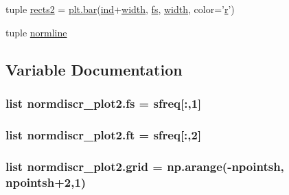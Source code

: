 \begin{DoxyCompactItemize}
\item 
tuple \hyperlink{namespacenormdiscr__plot2_ae0d990d06209b61e3d8b594d36937c72}{rects2} = \hyperlink{eepromer_8c_a2924c0b64ca8f0b241891bcc826b5602}{plt.\+bar}(\hyperlink{namespacenormdiscr__plot2_ad3d531a849a128e7a798433179420165}{ind}+\hyperlink{namespacenormdiscr__plot2_a25df6e806f2a5936e42f0dbb45a6d0ab}{width}, \hyperlink{namespacenormdiscr__plot2_a582805d46fcf8730646fa6cf7ea00b7d}{fs}, \hyperlink{namespacenormdiscr__plot2_a25df6e806f2a5936e42f0dbb45a6d0ab}{width}, color='\hyperlink{indexexpr_8h_ac434fd11cc2493608d8d91424d60c17e}{r}')
\item 
tuple \hyperlink{namespacenormdiscr__plot2_a55c7317cc02371eb982a60573ed2a46f}{normline}
\end{DoxyCompactItemize}


\subsection{Variable Documentation}
\hypertarget{namespacenormdiscr__plot2_a582805d46fcf8730646fa6cf7ea00b7d}{}
\subsubsection[{fs}]{\setlength{\rightskip}{0pt plus 5cm}list normdiscr\+\_\+plot2.\+fs = {\bf sfreq}\mbox{[}\+:,1\mbox{]}}\label{namespacenormdiscr__plot2_a582805d46fcf8730646fa6cf7ea00b7d}
\hypertarget{namespacenormdiscr__plot2_aa348b068eff201e8e9175a6f94404112}{}
\subsubsection[{ft}]{\setlength{\rightskip}{0pt plus 5cm}list normdiscr\+\_\+plot2.\+ft = {\bf sfreq}\mbox{[}\+:,2\mbox{]}}\label{namespacenormdiscr__plot2_aa348b068eff201e8e9175a6f94404112}
\hypertarget{namespacenormdiscr__plot2_a62ec823ef29766de66e391bd4a2dc284}{}
\subsubsection[{grid}]{\setlength{\rightskip}{0pt plus 5cm}list normdiscr\+\_\+plot2.\+grid = np.\+arange(-\/{\bf npointsh}, {\bf npointsh}+2,1)}\label{namespacenormdiscr__plot2_a62ec823ef29766de66e391bd4a2dc284}
\hypertarget{namespacenormdiscr__plot2_acb33a5c700b9bdb2d94bd5120a53a126}{}
